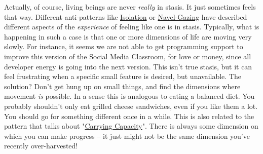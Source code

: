Actually, of course, living beings are never \emph{really} in stasis. It
just sometimes feels that way. Different anti-patterns like
\href{http://socialmediaclassroom.com/host/peeragogy/forum/anti-patterns-concerns-complaints-and-critiques\#comment-2267}{Isolation}
or
\href{http://socialmediaclassroom.com/host/peeragogy/forum/anti-patterns-concerns-complaints-and-critiques\#comment-1808}{Navel-Gazing}
have described different aspects of the \emph{experience} of feeling
like one is in stasis. Typically, what is happening in such a case is
that one or more dimensions of life are moving very slowly.
For instance, it seems we are not able to get programming support to
improve this version of the Social Media Classroom, for love or money,
since all developer energy is going into the next version. This isn't
true stasis, but it can feel frustrating when a specific small feature
is desired, but unavailable. The solution? Don't get hung up on small
things, and find the dimensions where movement \emph{is} possible. In a
sense this is analogous to eating a balanced diet. You probably
shouldn't only eat grilled cheese sandwiches, even if you like them a
lot. You should go for something different once in a while. This is also
related to the pattern that talks about
"\href{http://socialmediaclassroom.com/host/peeragogy/forum/patterns-and-use-cases\#comment-2320}{Carrying
Capacity}". There is always some dimension on which you can make
progress -- it just might not be the same dimension you've recently
over-harvested!
